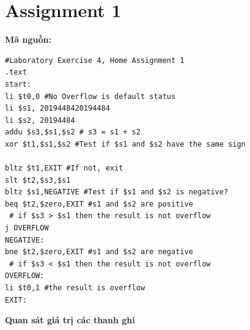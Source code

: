 \documentclass[12pt,a4paper,oneside]{article}
\begin{document}
\section*{Assignment 1}
\textbf{Mã nguồn:}
\begin{lstlisting}
#Laboratory Exercise 4, Home Assignment 1
.text
start:
li $t0,0 #No Overflow is default status
li $s1, 2019448420194484
li $s2, 20194484
addu $s3,$s1,$s2 # s3 = s1 + s2
xor $t1,$s1,$s2 #Test if $s1 and $s2 have the same sign

bltz $t1,EXIT #If not, exit
slt $t2,$s3,$s1
bltz $s1,NEGATIVE #Test if $s1 and $s2 is negative?
beq $t2,$zero,EXIT #s1 and $s2 are positive
 # if $s3 > $s1 then the result is not overflow
j OVERFLOW
NEGATIVE:
bne $t2,$zero,EXIT #s1 and $s2 are negative
 # if $s3 < $s1 then the result is not overflow
OVERFLOW:
li $t0,1 #the result is overflow
EXIT:

\end{lstlisting}
\textbf{Quan sát giá trị các thanh ghi}
\end{document}
